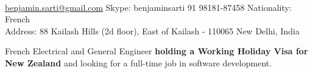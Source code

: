 \documentclass[12pt,a4paper]{article} %
\begin{document}
 



\\
\begin{small}
\noindent\href{mailto:benjamin.sarti@gmail.com}{benjamin.sarti@gmail.com} \bull Skype: benjaminsarti \bull %
\textsmaller{+}91 98181-87458 \bull Nationality: French\\ %
Address: 88 Kailash Hills (2d floor), East of Kailash - 110065 New Delhi, India %
\end{small}


\spacedhrule{0.9em}{-0.4em} %




French Electrical and General Engineer \textbf{holding a Working Holiday Visa for New Zealand} and looking for a full-time job in software development.
\end{document}
